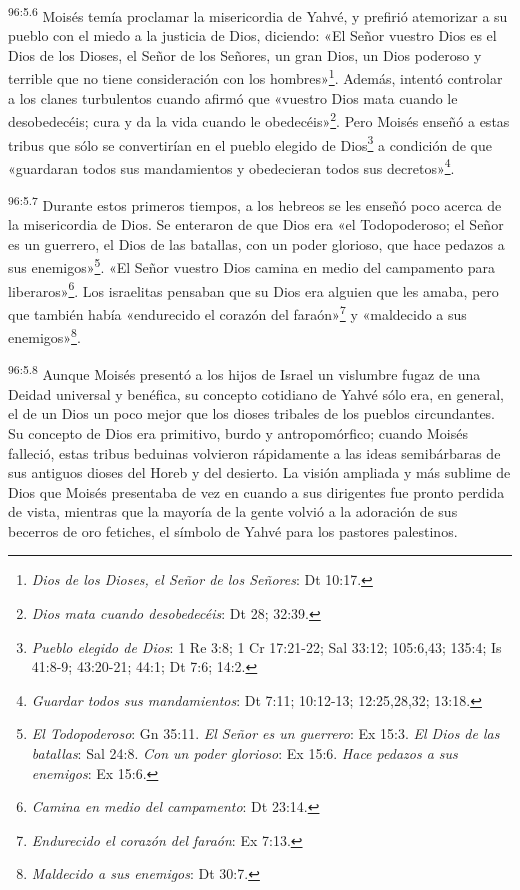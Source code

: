 \par
\textsuperscript{96:5.6} Moisés temía proclamar la misericordia de Yahvé, y prefirió atemorizar a su pueblo con el miedo a la justicia de Dios, diciendo: «El Señor vuestro Dios es el Dios de los Dioses, el Señor de los Señores, un gran Dios, un Dios poderoso y terrible que no tiene consideración con los hombres»\footnote{\textit{Dios de los Dioses, el Señor de los Señores}: Dt 10:17.}. Además, intentó controlar a los clanes turbulentos cuando afirmó que «vuestro Dios mata cuando le desobedecéis; cura y da la vida cuando le obedecéis»\footnote{\textit{Dios mata cuando desobedecéis}: Dt 28; 32:39.}. Pero Moisés enseñó a estas tribus que sólo se convertirían en el pueblo elegido de Dios\footnote{\textit{Pueblo elegido de Dios}: 1 Re 3:8; 1 Cr 17:21-22; Sal 33:12; 105:6,43; 135:4; Is 41:8-9; 43:20-21; 44:1; Dt 7:6; 14:2.} a condición de que «guardaran todos sus mandamientos y obedecieran todos sus decretos»\footnote{\textit{Guardar todos sus mandamientos}: Dt 7:11; 10:12-13; 12:25,28,32; 13:18.}.

\par
\textsuperscript{96:5.7} Durante estos primeros tiempos, a los hebreos se les enseñó poco acerca de la misericordia de Dios. Se enteraron de que Dios era «el Todopoderoso; el Señor es un guerrero, el Dios de las batallas, con un poder glorioso, que hace pedazos a sus enemigos»\footnote{\textit{El Todopoderoso}: Gn 35:11. \textit{El Señor es un guerrero}: Ex 15:3. \textit{El Dios de las batallas}: Sal 24:8. \textit{Con un poder glorioso}: Ex 15:6. \textit{Hace pedazos a sus enemigos}: Ex 15:6.}. «El Señor vuestro Dios camina en medio del campamento para liberaros»\footnote{\textit{Camina en medio del campamento}: Dt 23:14.}. Los israelitas pensaban que su Dios era alguien que les amaba, pero que también había «endurecido el corazón del faraón»\footnote{\textit{Endurecido el corazón del faraón}: Ex 7:13.} y «maldecido a sus enemigos»\footnote{\textit{Maldecido a sus enemigos}: Dt 30:7.}.

\par
\textsuperscript{96:5.8} Aunque Moisés presentó a los hijos de Israel un vislumbre fugaz de una Deidad universal y benéfica, su concepto cotidiano de Yahvé sólo era, en general, el de un Dios un poco mejor que los dioses tribales de los pueblos circundantes. Su concepto de Dios era primitivo, burdo y antropomórfico; cuando Moisés falleció, estas tribus beduinas volvieron rápidamente a las ideas semibárbaras de sus antiguos dioses del Horeb y del desierto. La visión ampliada y más sublime de Dios que Moisés presentaba de vez en cuando a sus dirigentes fue pronto perdida de vista, mientras que la mayoría de la gente volvió a la adoración de sus becerros de oro fetiches, el símbolo de Yahvé para los pastores palestinos.

